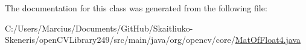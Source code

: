 The documentation for this class was generated from the following file\+:\begin{DoxyCompactItemize}
\item 
C\+:/\+Users/\+Marcius/\+Documents/\+Git\+Hub/\+Skaitliuko-\/\+Skeneris/open\+C\+V\+Library249/src/main/java/org/opencv/core/\mbox{\hyperlink{_mat_of_float4_8java}{Mat\+Of\+Float4.\+java}}\end{DoxyCompactItemize}
